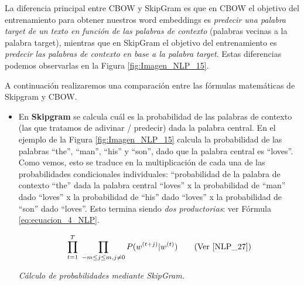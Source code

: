 \documentclass[12pt,a4paper]{article}
\begin{document}
\begin{sloppypar}
La diferencia principal entre CBOW y SkipGram es que en CBOW el objetivo del entrenamiento para obtener nuestros word embeddings es \textit{predecir una palabra target de un texto en función de las palabras de contexto} (palabras vecinas a la palabra target), mientras que en SkipGram el objetivo del entrenamiento es \textit{predecir las palabras de contexto en base a la palabra target}. Estas diferencias podemos observarlas en la Figura \ref{fig:Imagen_NLP_15}.

A continuación realizaremos una comparación entre las fórmulas matemáticas de Skipgram y CBOW. 
\begin{itemize}

\item En \textbf{Skipgram} se calcula cuál es la probabilidad de las palabras de contexto (las que tratamos de adivinar / predecir) dada la palabra central. En el ejemplo de la  Figura \ref{fig:Imagen_NLP_15} calcula la probabilidad de las palabras “the”, “man”, “his” y “son”, dado que la palabra central es “loves”. Como vemos, esto se traduce en la multiplicación de cada una de las probabilidades condicionales individuales: “probabilidad de la palabra de contexto “the” dada la palabra central “loves” x la probabilidad de “man” dado “loves” x la probabilidad de “his” dado “loves” x la probabilidad de “son” dado “loves”. Esto termina siendo \textit{dos productorias}: ver Fórmula \ref{eq:ecuacion_4_NLP}. 

\begin{equation}\label{eq:ecuacion_4_NLP}
\prod_{t=1}^{T} \; \prod_{-m \leq j \leq m, j \neq 0}  P(w^{(t+j)} | w^{(t)}) \qquad \text{(Ver \cite{NLP_27})}
\end{equation}
\begin{center}
\textit{Cálculo de probabilidades mediante SkipGram.}
\end{center}


\end{itemize}
\end{sloppypar}
\end{document}
